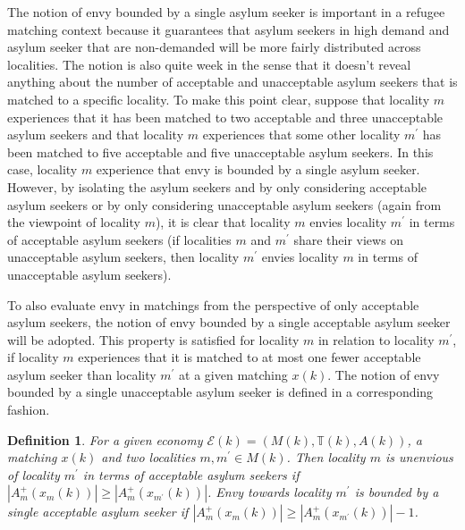 \documentclass[12pt,fleqn]{article}
\newtheorem{definition}{Definition}
\begin{document}
\noindent The notion of envy bounded by a single asylum seeker is important in a refugee matching context because it guarantees that asylum seekers in high demand and asylum seeker that are non-demanded will be more fairly distributed across localities. The notion is also quite week in the sense that it doesn't reveal anything about the number of acceptable and unacceptable asylum seekers that is matched to a specific locality. To make this point clear, suppose that locality $m$ experiences that it has been matched to two acceptable and three unacceptable asylum seekers and that locality $m$ experiences that some other locality $m^\prime$ has been matched to five acceptable and five unacceptable asylum seekers. In this case, locality $m$ experience that envy is bounded by a single asylum seeker. However, by isolating the asylum seekers and by only considering acceptable asylum seekers or by only considering unacceptable asylum seekers (again from the viewpoint of locality $m$), it is clear that locality $m$ envies locality $m^\prime$ in terms of acceptable asylum seekers (if localities $m$ and $m^\prime$ share their views on unacceptable asylum seekers, then locality $m^\prime$ envies locality $m$ in terms of unacceptable asylum seekers).

To also evaluate envy in matchings from the perspective of only acceptable asylum seekers, the notion of envy bounded by a single acceptable asylum seeker will be adopted. This property is satisfied for locality $m$ in relation to locality $m^\prime$, if locality $m$ experiences that it is matched to at most one fewer acceptable asylum seeker than locality $m^\prime$ at a given matching $x(k)$. The notion of envy bounded by a single unacceptable asylum seeker is defined in a corresponding fashion.

\begin{definition}\rm\label{DEF:1-Envy_ACC}
For a given economy $\mathcal{E}(k)=(M(k),\mathbb{T}(k),A(k))$, a matching $x(k)$ and two localities $m,m^\prime\in M(k)$. Then locality $m$ is unenvious of locality $m^\prime$ in terms of acceptable asylum seekers if $|A_m^+(x_m(k))|\geq |A_m^+(x_{m^\prime}(k))|$. Envy towards locality $m^\prime$ is bounded by a single acceptable asylum seeker if $|A_m^+(x_m(k))|\geq |A_m^+(x_{m^\prime}(k))|-1$.
\end{definition}
\end{document}
